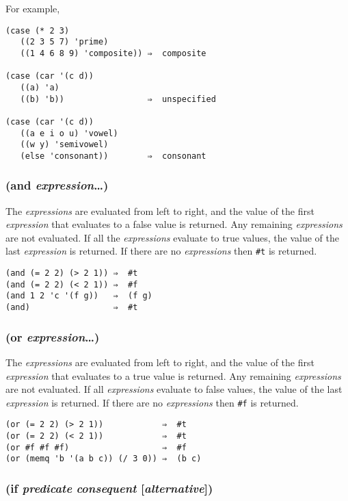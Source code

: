 \documentclass{article}
\begin{document}
For example,

\begin{verbatim}
(case (* 2 3)
   ((2 3 5 7) 'prime)
   ((1 4 6 8 9) 'composite)) ⇒  composite

(case (car '(c d))
   ((a) 'a)
   ((b) 'b))                 ⇒  unspecified

(case (car '(c d))
   ((a e i o u) 'vowel)
   ((w y) 'semivowel)
   (else 'consonant))        ⇒  consonant
\end{verbatim}

\subsubsection{(and \emph{expression}\ldots{})}

The \emph{expressions} are evaluated from left to right, and the value of the first
\emph{expression} that evaluates to a false value is returned. Any remaining
\emph{expressions} are not evaluated. If all the \emph{expressions} evaluate to true values,
the value of the last \emph{expression} is returned. If there are no \emph{expressions} then
\verb|#t| is returned.

\begin{verbatim}
(and (= 2 2) (> 2 1)) ⇒  #t
(and (= 2 2) (< 2 1)) ⇒  #f
(and 1 2 'c '(f g))   ⇒  (f g)
(and)                 ⇒  #t
\end{verbatim}

\subsubsection{(or \emph{expression}\ldots{})}

The \emph{expressions} are evaluated from left to right, and the value of the first
\emph{expression} that evaluates to a true value is returned. Any remaining \emph{expressions}
are not evaluated. If all \emph{expressions} evaluate to false values, the value of the last
\emph{expression} is returned. If there are no \emph{expressions} then \verb|#f| is
returned.

\begin{verbatim}
(or (= 2 2) (> 2 1))            ⇒  #t
(or (= 2 2) (< 2 1))            ⇒  #t
(or #f #f #f)                   ⇒  #f
(or (memq 'b '(a b c)) (/ 3 0)) ⇒  (b c)
\end{verbatim}

\subsubsection{(if \emph{predicate} \emph{consequent} [\emph{alternative}])}
\end{document}
